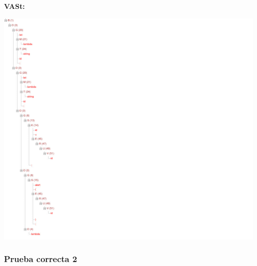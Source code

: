 \documentclass[11pt, , a4paper, titlepage]{article}
\newenvironment{changemargin}[2]{%
\begin{list}{}{%
\setlength{\topsep}{0pt}%
\setlength{\leftmargin}{#1}%
\setlength{\rightmargin}{#2}%
\setlength{\listparindent}{\parindent}%
\setlength{\itemindent}{\parindent}%
\setlength{\parsep}{\parskip}%
}%
\item[]}{\end{list}}
\begin{document}
\begin{changemargin}{+0.5cm}{+0cm}
    \textbf{VASt:}
    \vspace{1mm}
    \begin{center}
        \includegraphics[width=1.4\textwidth]{./resources/test-cases/case-1/tree.jpg}
    \end{center}

\end{changemargin}
\clearpage

\subsubsection{Prueba correcta 2}
\end{document}
